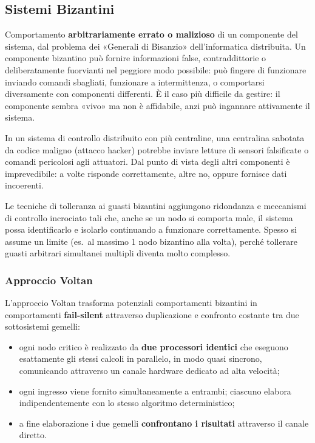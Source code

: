 \subsection{Sistemi Bizantini}
\begin{defn}
Comportamento \textbf{arbitrariamente errato o malizioso} di un componente del sistema, dal problema dei «Generali di Bisanzio» dell'informatica distribuita. Un componente bizantino può fornire informazioni false, contraddittorie o deliberatamente fuorvianti nel peggiore modo possibile: può fingere di funzionare inviando comandi sbagliati, funzionare a intermittenza, o comportarsi diversamente con componenti differenti. È il caso più difficile da gestire: il componente sembra «vivo» ma non è affidabile, anzi può ingannare attivamente il sistema.
\end{defn}

\begin{ex}
In un sistema di controllo distribuito con più centraline, una centralina sabotata da codice maligno (attacco hacker) potrebbe inviare letture di sensori falsificate o comandi pericolosi agli attuatori. Dal punto di vista degli altri componenti è imprevedibile: a volte risponde correttamente, altre no, oppure fornisce dati incoerenti.
\end{ex}

Le tecniche di tolleranza ai guasti bizantini aggiungono ridondanza e meccanismi di controllo incrociato tali che, anche se un nodo si comporta male, il sistema possa identificarlo e isolarlo continuando a funzionare correttamente. Spesso si assume un limite (es.\ al massimo 1 nodo bizantino alla volta), perché tollerare guasti arbitrari simultanei multipli diventa molto complesso.

\subsubsection{Approccio Voltan}
L'approccio Voltan trasforma potenziali comportamenti bizantini in comportamenti \textbf{fail-silent} attraverso duplicazione e confronto costante tra due sottosistemi gemelli:
\begin{itemize}
    \item ogni nodo critico è realizzato da \textbf{due processori identici} che eseguono esattamente gli stessi calcoli in parallelo, in modo quasi sincrono, comunicando attraverso un canale hardware dedicato ad alta velocità;
    \item ogni ingresso viene fornito simultaneamente a entrambi; ciascuno elabora indipendentemente con lo stesso algoritmo deterministico;
    \item a fine elaborazione i due gemelli \textbf{confrontano i risultati} attraverso il canale diretto.
\end{itemize}

